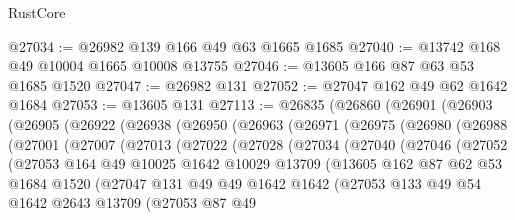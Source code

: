 \begin{lexlean}{RustCore}
\begin{coremodule}
@27034 := @26982 @139 @166 @49 @63 @1665 @1685
@27040 := @13742 @168 @49 @10004 @1665 @10008 @13755
@27046 := @13605 @166 @87 @63 @53 @1685 @1520
@27047 := @26982 @131
@27052 := @27047 @162 @49 @62 @1642 @1684
@27053 := @13605 @131
@27113 := @26835
    (@26860
      (@26901
        (@26903
          (@26905
            (@26922
              (@26938
                (@26950
                  (@26963
                    (@26971
                      (@26975
                        (@26980
                          (@26988
                            (@27001
                              (@27007
                                (@27013
                                  (@27022
                                    (@27028
                                      (@27034
                                        (@27040
                                          (@27046
                                            (@27052
                                              (@27053
                                                @164
                                                @49
                                                @10025
                                                @1642
                                                @10029
                                                @13709
                                                (@13605
                                                  @162
                                                  @87
                                                  @62
                                                  @53
                                                  @1684
                                                  @1520
                                                  (@27047
                                                    @131
                                                    @49
                                                    @49
                                                    @1642
                                                    @1642
                                                    (@27053
                                                      @133
                                                      @49
                                                      @54
                                                      @1642
                                                      @2643
                                                      @13709
                                                      (@27053
                                                        @87
                                                        @49

\end{coremodule}
\end{lexlean}
